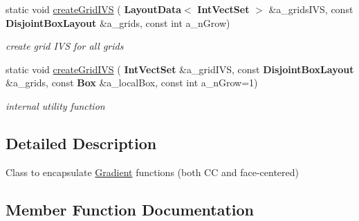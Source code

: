 \begin{DoxyCompactItemize}
static void \hyperlink{class_gradient_a85f5cea4187536e8430d485a306b131d}{create\+Grid\+I\+VS} (\textbf{ Layout\+Data}$<$ \textbf{ Int\+Vect\+Set} $>$ \&a\+\_\+grids\+I\+VS, const \textbf{ Disjoint\+Box\+Layout} \&a\+\_\+grids, const int a\+\_\+n\+Grow)
\begin{DoxyCompactList}\small\item\em create grid I\+VS for all grids \end{DoxyCompactList}\item 
static void \hyperlink{class_gradient_ab8d450f2f5e455e2a33ef3a33b2f5a98}{create\+Grid\+I\+VS} (\textbf{ Int\+Vect\+Set} \&a\+\_\+grid\+I\+VS, const \textbf{ Disjoint\+Box\+Layout} \&a\+\_\+grids, const \textbf{ Box} \&a\+\_\+local\+Box, const int a\+\_\+n\+Grow=1)
\begin{DoxyCompactList}\small\item\em internal utility function \end{DoxyCompactList}\end{DoxyCompactItemize}


\subsection{Detailed Description}
Class to encapsulate \hyperlink{class_gradient}{Gradient} functions (both CC and face-\/centered) 

\subsection{Member Function Documentation}
\mbox{\label{class_gradient_a6c741fa4909be6c7d55ddc70a128ca93}} 
